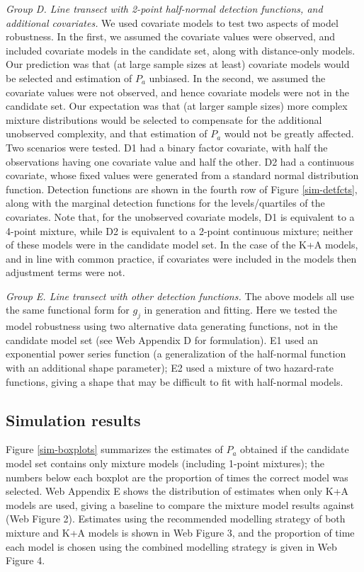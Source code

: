 \documentclass[authoryear,preprint,review,12pt]{elsarticle}
\begin{document}
\textit{Group D. Line transect with 2-point half-normal detection functions, and additional covariates.}  We used covariate models to test two aspects of model robustness. In the first, we assumed the covariate values were observed, and included covariate models in the candidate set, along with distance-only models. Our prediction was that (at large sample sizes at least) covariate models would be selected and estimation of $P_a$ unbiased.  In the second, we assumed the covariate values were not observed, and hence covariate models were not in the candidate set.  Our expectation was that (at larger sample sizes) more complex mixture distributions would be selected to compensate for the additional unobserved complexity, and that estimation of $P_a$ would not be greatly affected.  Two scenarios were tested.  D1 had a binary factor covariate, with half the observations having one covariate value and half the other.  D2 had a continuous covariate, whose fixed values were generated from a standard normal distribution function.  Detection functions are shown in the fourth row of Figure \ref{sim-detfcts}, along with the marginal detection functions for the levels/quartiles of the covariates. Note that, for the unobserved covariate models, D1 is equivalent to a 4-point mixture, while D2 is equivalent to a 2-point continuous mixture; neither of these models were in the candidate model set.  In the case of the K+A models, and in line with common practice, if covariates were included in the models then adjustment terms were not.

\textit{Group E. Line transect with other detection functions.} The above models all use the same functional form for $g_j$ in generation and fitting.  Here we tested the model robustness using two alternative data generating functions, not in the candidate model set (see Web Appendix D for formulation).  E1 used an exponential power series function (a generalization of the half-normal function with an additional shape parameter); E2 used a mixture of two hazard-rate functions, giving a shape that may be difficult to fit with half-normal models.
  
\subsection{Simulation results}
\label{s:sims_res}

Figure \ref{sim-boxplots} summarizes the estimates of $P_a$ obtained if the candidate model set contains only mixture models (including 1-point mixtures); the numbers below each boxplot are the proportion of times the correct model was selected. Web Appendix E shows the distribution of estimates when only K+A models are used, giving a baseline to compare the mixture model results against (Web Figure 2). Estimates using the recommended modelling strategy of both mixture and K+A models is shown in Web Figure 3, and the proportion of time each model is chosen using the combined modelling strategy is given in Web Figure 4.
\end{document}
